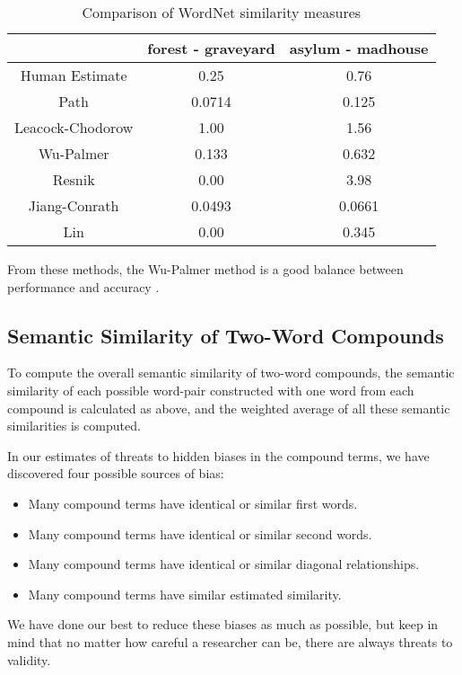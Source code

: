 \documentclass{article}
\begin{document}
\begin{table}[h!]
\centering
\begin{tabular}{|c||c|c|}
	\hline
	& forest - graveyard & asylum - madhouse \\
	\hline
	Human Estimate & 0.25 & 0.76 \\
	Path & 0.0714 & 0.125 \\
	Leacock-Chodorow & 1.00 & 1.56 \\
	Wu-Palmer & 0.133 & 0.632 \\
	Resnik & 0.00 & 3.98 \\
	Jiang-Conrath & 0.0493 & 0.0661 \\
	Lin & 0.00 & 0.345 \\
	\hline
\end{tabular}
\caption{Comparison of WordNet similarity measures} %
\label{table:wordnetsimilarity}
\end{table}

From these methods, the Wu-Palmer method is a good balance between performance and accuracy \citep{budanitsky2006evaluating,seco2004intrinsic,mihalcea2006corpus}.

\subsection{Semantic Similarity of Two-Word Compounds}

To compute the overall semantic similarity of two-word compounds, the semantic similarity of each possible word-pair constructed with one word from each compound is calculated as above, and the weighted average of all these semantic similarities is computed.

In our estimates of threats to hidden biases in the compound terms, we have discovered four possible sources of bias:
\begin{itemize}
	\item Many compound terms have identical or similar first words.
	\item Many compound terms have identical or similar second words.
	\item Many compound terms have identical or similar diagonal relationships.
	\item Many compound terms have similar estimated similarity.
\end{itemize}
We have done our best to reduce these biases as much as possible, but keep in mind that no matter how careful a researcher can be, there are always threats to validity.
\end{document}
